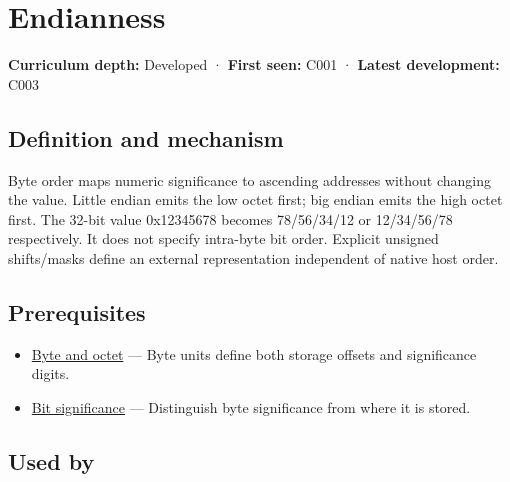 \hypertarget{appendix-bc07c3d25b18}{}\label{referencestart:appendix-bc07c3d25b18}
\section{Endianness}\label{appendix-bc07c3d25b18-endianness}

\textbf{Curriculum depth:} Developed · \textbf{First seen:} C001 · \textbf{Latest development:} C003

\begin{allmightroledefinition}

\subsection{Definition and mechanism}\label{appendix-bc07c3d25b18-definition-and-mechanism}

Byte order maps numeric significance to ascending addresses without changing the value. Little endian emits the low octet first; big endian emits the high octet first. The 32-bit value 0x12345678 becomes 78/56/34/12 or 12/34/56/78 respectively. It does not specify intra-byte bit order. Explicit unsigned shifts/masks define an external representation independent of native host order.

\end{allmightroledefinition}

\subsection{Prerequisites}\label{appendix-bc07c3d25b18-prerequisites}

\begin{itemize}
\tightlist
\item
  \hyperref[appendix-5bee2df85484]{Byte and octet} --- Byte units define both storage offsets and significance digits.
\item
  \hyperref[appendix-280445746493]{Bit significance} --- Distinguish byte significance from where it is stored.
\end{itemize}

\subsection{Used by}\label{appendix-bc07c3d25b18-used-by}

